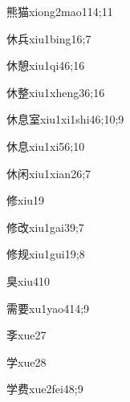 \begin{verbete}{熊猫}{xiong2mao1}{14;11}
\end{verbete}
\begin{verbete}{休兵}{xiu1bing1}{6;7}
\end{verbete}
\begin{verbete}{休憩}{xiu1qi4}{6;16}
\end{verbete}
\begin{verbete}{休整}{xiu1xheng3}{6;16}
\end{verbete}
\begin{verbete}{休息室}{xiu1xi1shi4}{6;10;9}
\end{verbete}
\begin{verbete}{休息}{xiu1xi5}{6;10}
\end{verbete}
\begin{verbete}{休闲}{xiu1xian2}{6;7}
\end{verbete}
\begin{verbete}{修}{xiu1}{9}
\end{verbete}
\begin{verbete}{修改}{xiu1gai3}{9;7}
\end{verbete}
\begin{verbete}{修规}{xiu1gui1}{9;8}
\end{verbete}
\begin{verbete}{臭}{xiu4}{10}
\end{verbete}
\begin{verbete}{需要}{xu1yao4}{14;9}
\end{verbete}
\begin{verbete}{斈}{xue2}{7}
\end{verbete}
\begin{verbete}{学}{xue2}{8}
\end{verbete}
\begin{verbete}{学费}{xue2fei4}{8;9}
\end{verbete}
